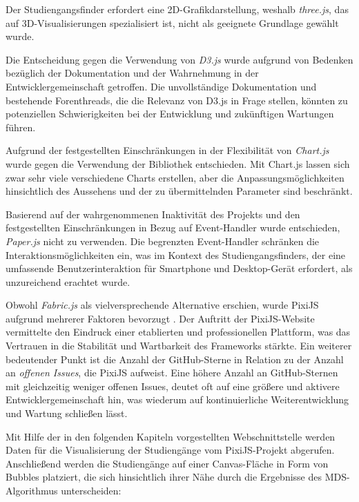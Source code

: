 
Der Studiengangsfinder erfordert eine 2D-Grafikdarstellung, weshalb
\textit{three.js}, das auf 3D-Visualisierungen spezialisiert ist, nicht als
geeignete Grundlage gewählt wurde. \parencite{threejs_threejs_2023}

Die Entscheidung gegen die Verwendung von \textit{D3.js} wurde aufgrund
von Bedenken bezüglich der Dokumentation und der Wahrnehmung in der 
Entwicklergemeinschaft getroffen. Die unvollständige Dokumentation und
bestehende Forenthreads, die die Relevanz von D3.js in Frage stellen, könnten zu
potenziellen Schwierigkeiten bei der Entwicklung und zukünftigen Wartungen
führen. \parencite{bostock_d3js_2023}


Aufgrund der festgestellten Einschränkungen in der Flexibilität von \textit{Chart.js} wurde gegen die Verwendung der Bibliothek entschieden. Mit Chart.js lassen sich zwar sehr viele verschiedene Charts erstellen, aber die Anpassungsmöglichkeiten hinsichtlich des Aussehens und der zu übermittelnden Parameter sind beschränkt. \parencite{etimberg_chartjs_2023}

Basierend auf der wahrgenommenen Inaktivität des Projekts und den festgestellten 
Einschränkungen in Bezug auf Event-Handler wurde entschieden, \textit{Paper.js}
nicht zu verwenden. \parencite{lehni_paperjs_2023} Die begrenzten Event-Handler schränken
die Interaktionsmöglichkeiten ein, was im Kontext des Studiengangsfinders, der
eine umfassende Benutzerinteraktion für Smartphone und Desktop-Gerät erfordert,
als unzureichend erachtet wurde. \parencite{etimberg_paperjs_2023}

Obwohl \textit{Fabric.js} als vielversprechende Alternative erschien, wurde PixiJS aufgrund mehrerer Faktoren bevorzugt \parencite{zaytsev_fabricjs_2023}. Der Auftritt der PixiJS-Website vermittelte den Eindruck einer etablierten und professionellen Plattform, was das Vertrauen in die Stabilität und Wartbarkeit des Frameworks stärkte. Ein weiterer bedeutender Punkt ist die Anzahl der GitHub-Sterne in Relation zu der Anzahl an \textit{offenen Issues}, die PixiJS aufweist. Eine höhere Anzahl an GitHub-Sternen mit gleichzeitig weniger offenen Issues, deutet oft auf eine größere und aktivere Entwicklergemeinschaft hin, was wiederum auf kontinuierliche Weiterentwicklung und Wartung schließen lässt. \parencite{batista_github_2023}

Mit Hilfe der in den folgenden Kapiteln vorgestellten Webschnittstelle werden Daten für die Visualisierung der Studiengänge vom PixiJS-Projekt abgerufen. Anschließend werden die Studiengänge auf einer Canvas-Fläche in Form von Bubbles platziert, die sich hinsichtlich ihrer Nähe durch die Ergebnisse des MDS-Algorithmus unterscheiden:


